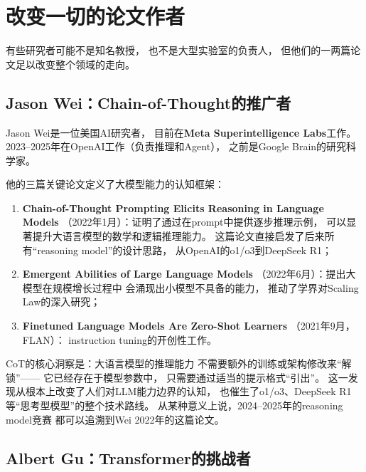 \section{改变一切的论文作者}
\label{sec:paper-authors}

有些研究者可能不是知名教授，
也不是大型实验室的负责人，
但他们的一两篇论文足以改变整个领域的走向。

\subsection{Jason Wei：Chain-of-Thought的推广者}

Jason Wei是一位美国AI研究者，
目前在\textbf{Meta Superintelligence Labs}工作。
2023--2025年在OpenAI工作（负责推理和Agent），
之前是Google Brain的研究科学家。

他的三篇关键论文定义了大模型能力的认知框架：

\begin{enumerate}[noitemsep]
  \item \textbf{Chain-of-Thought Prompting Elicits Reasoning in Language Models}
        （2022年1月）：证明了通过在prompt中提供逐步推理示例，
        可以显著提升大语言模型的数学和逻辑推理能力。
        这篇论文直接启发了后来所有``reasoning model''的设计思路，
        从OpenAI的o1/o3到DeepSeek R1；
  \item \textbf{Emergent Abilities of Large Language Models}
        （2022年6月）：提出大模型在规模增长过程中
        会涌现出小模型不具备的能力，
        推动了学界对Scaling Law的深入研究；
  \item \textbf{Finetuned Language Models Are Zero-Shot Learners}
        （2021年9月，FLAN）：
        instruction tuning的开创性工作。
\end{enumerate}

\begin{whybox}
CoT的核心洞察是：大语言模型的推理能力
不需要额外的训练或架构修改来``解锁''——
它已经存在于模型参数中，
只需要通过适当的提示格式``引出''。
这一发现从根本上改变了人们对LLM能力边界的认知，
也催生了o1/o3、DeepSeek R1等``思考型模型''的整个技术路线。
从某种意义上说，2024--2025年的reasoning model竞赛
都可以追溯到Wei 2022年的这篇论文。
\end{whybox}

\subsection{Albert Gu：Transformer的挑战者}

